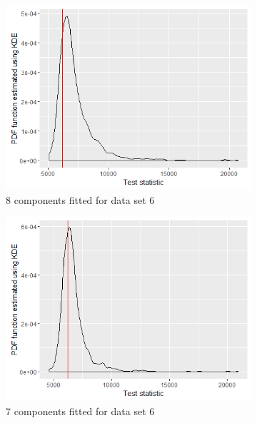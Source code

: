 \begin{figure}[!htb]
\centering
\begin{subfigure}[b]{0.4\textwidth}
		\includegraphics[width=\textwidth]{mainmatter/chapter_5_simulation_study/ppc_5wellsep8comp.png}
        \caption{\label{fig : ppc_5wellsep8comp}8 components fitted for data set 6}
	\end{subfigure}
	\begin{subfigure}[b]{0.4\textwidth}
		\includegraphics[width=\textwidth]{mainmatter/chapter_5_simulation_study/ppc_5wellsep7comp.png}
          \caption{\label{fig : ppc_5wellsep7comp}7 components fitted for data set 6}
	\end{subfigure}
	\begin{subfigure}[b]{0.4\textwidth}

\end{subfigure}
\end{figure}
